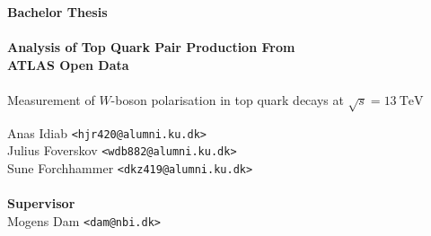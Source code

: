\documentclass[a4paper,oneside]{memoir}
\begin{document}
    \thispagestyle{empty}
    \begin{adjustwidth}{-3cm}{-1.5cm}
    \vspace*{-1cm}
    \textbf{\Huge Bachelor Thesis} \\
    \vspace*{2.5cm} \\
    \textbf{\Huge Analysis of Top Quark Pair Production From \\ATLAS Open Data} \\
    \vspace*{.1cm} \\
    {\huge Measurement of $W$-boson polarisation in top quark decays at $\sqrt s = 13 \ \mathrm{TeV}$}\\
    \begin{tabbing}
    Anas Idiab  \hspace{2cm} \= \texttt{<hjr420@alumni.ku.dk>} \\
    Julius Foverskov \> \texttt{<wdb882@alumni.ku.dk>} \\
    Sune Forchhammer \> \texttt{<dkz419@alumni.ku.dk>} \\
    \\[12cm]
    \textbf{\Large Supervisor} \\
    Mogens Dam \> \texttt{<dam@nbi.dk>} \\
    \end{tabbing}
    \end{adjustwidth}
    \newpage
    \ClearWallPaper
\end{document}
